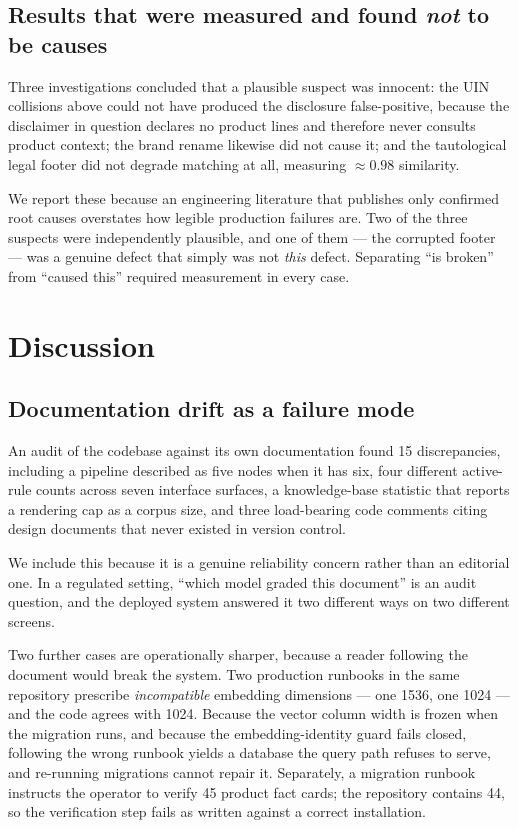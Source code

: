 \documentclass[10pt]{article}
\begin{document}
\subsection{Results that were measured and found \emph{not} to be causes}

Three investigations concluded that a plausible suspect was innocent: the UIN
collisions above could not have produced the disclosure false-positive, because
the disclaimer in question declares no product lines and therefore never
consults product context; the brand rename likewise did not cause it; and the
tautological legal footer did not degrade matching at all, measuring
$\approx 0.98$ similarity.

We report these because an engineering literature that publishes only
confirmed root causes overstates how legible production failures are. Two of
the three suspects were independently plausible, and one of them --- the
corrupted footer --- was a genuine defect that simply was not \emph{this}
defect. Separating ``is broken'' from ``caused this'' required measurement in
every case.

\section{Discussion}

\subsection{Documentation drift as a failure mode}

An audit of the codebase against its own documentation found 15 discrepancies,
including a pipeline described as five nodes when it has six, four different
active-rule counts across seven interface surfaces, a knowledge-base statistic
that reports a rendering cap as a corpus size, and three load-bearing code
comments citing design documents that never existed in version control.

We include this because it is a genuine reliability concern rather than an
editorial one. In a regulated setting, ``which model graded this document'' is
an audit question, and the deployed system answered it two different ways on
two different screens.

Two further cases are operationally sharper, because a reader following the
document would break the system. Two production runbooks in the same repository
prescribe \emph{incompatible} embedding dimensions --- one 1536, one 1024 ---
and the code agrees with 1024. Because the vector column width is frozen when
the migration runs, and because the embedding-identity guard fails closed,
following the wrong runbook yields a database the query path refuses to serve,
and re-running migrations cannot repair it. Separately, a migration runbook
instructs the operator to verify 45 product fact cards; the repository contains
44, so the verification step fails as written against a correct installation.
\end{document}

